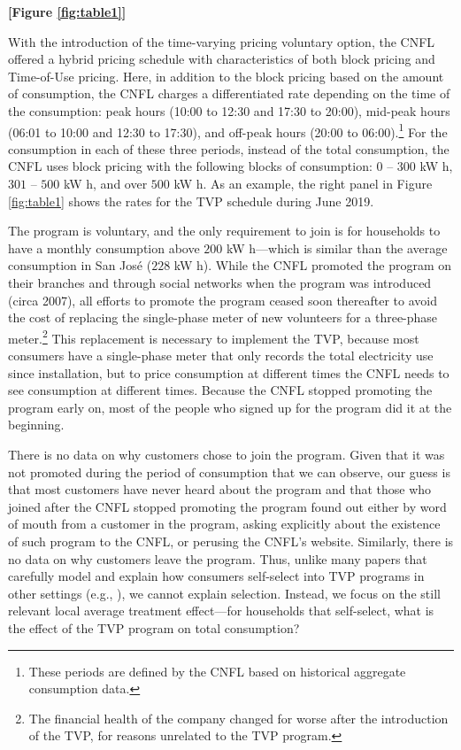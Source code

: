 \documentclass[12pt]{article}
\begin{document}
\centerline{\textbf{[Figure \ref{fig:table1}]}}


With the introduction of the time-varying pricing voluntary option, the CNFL offered a hybrid pricing schedule with characteristics of both block pricing and Time-of-Use pricing. Here, in addition to the block pricing based on the amount of consumption, the CNFL charges a differentiated rate depending on the time of the consumption: peak hours (10:00 to 12:30 and 17:30 to 20:00), mid-peak hours (06:01 to 10:00 and 12:30 to 17:30), and off-peak hours (20:00 to 06:00).\footnote{These periods are defined by the CNFL based on historical aggregate consumption data.} For the consumption in each of these three periods, instead of the total consumption, the CNFL uses block pricing with the following blocks of consumption: $0$ – $300$ kW h, $301$ – $500$ kW h, and over $500$ kW h. As an example, the right panel in Figure \ref{fig:table1} shows the rates for the TVP schedule during June 2019.

The program is voluntary, and the only requirement to join is for households to have a monthly consumption above $200$ kW h---which is similar than the average consumption in San José ($228$ kW h). While the CNFL promoted the program on their branches and through social networks when the program was introduced (circa 2007), all efforts to promote the program ceased soon thereafter to avoid the cost of replacing the single-phase meter of new volunteers for a three-phase meter.\footnote{The financial health of the company changed for worse after the introduction of the TVP, for reasons unrelated to the TVP program.} This replacement is necessary to implement the TVP, because most consumers have a single-phase meter that only records the total electricity use since installation, but to price consumption at different times the CNFL needs to see consumption at different times. Because the CNFL stopped promoting the program early on, most of the people who signed up for the program did it at the beginning.

There is no data on why customers chose to join the program. Given that it was not promoted during the period of consumption that we can observe, our guess is that most customers have never heard about the program and that those who joined after the CNFL stopped promoting the program found out either by word of mouth from a customer in the program, asking explicitly about the existence of such program to the CNFL, or perusing the CNFL’s website. Similarly, there is no data on why customers leave the program. Thus, unlike many papers that carefully model and explain how consumers self-select into TVP programs in other settings (e.g., \cite{itoSelectionWelfareGains2021}), we cannot explain selection. Instead, we focus on the still relevant local average treatment effect---for households that self-select, what is the effect of the TVP program on total consumption?
\end{document}
